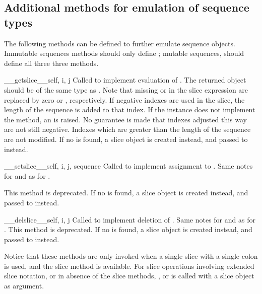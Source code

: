 \subsection{Additional methods for emulation of sequence types
  \label{sequence-methods}}

The following methods can be defined to further emulate sequence
objects.  Immutable sequences methods should only define
; mutable sequences, should define all three
three methods.

\begin{methoddesc}{__getslice__}{self, i, j}
Called to implement evaluation of .
The returned object should be of the same type as .  Note
that missing  or  in the slice expression are replaced
by zero or , respectively.  If negative indexes are
used in the slice, the length of the sequence is added to that index.
If the instance does not implement the  method, an
 is raised.
No guarantee is made that indexes adjusted this way are not still
negative.  Indexes which are greater than the length of the sequence
are not modified.
If no  is found, a slice
object is created instead, and passed to  instead.
\end{methoddesc}

\begin{methoddesc}{__setslice__}{self, i, j, sequence}
Called to implement assignment to .
Same notes for  and  as for .

This method is deprecated. If no  is found, a
slice object is created instead, and passed to 
instead.
\end{methoddesc}

\begin{methoddesc}{__delslice__}{self, i, j}
Called to implement deletion of .
Same notes for  and  as for .
This method is deprecated. If no  is found, a
slice object is created instead, and passed to 
instead.
\end{methoddesc}

Notice that these methods are only invoked when a single slice with a
single colon is used, and the slice method is available.  For slice
operations involving extended slice notation, or in absence of the
slice methods, ,  or
 is called with a slice object as argument.

